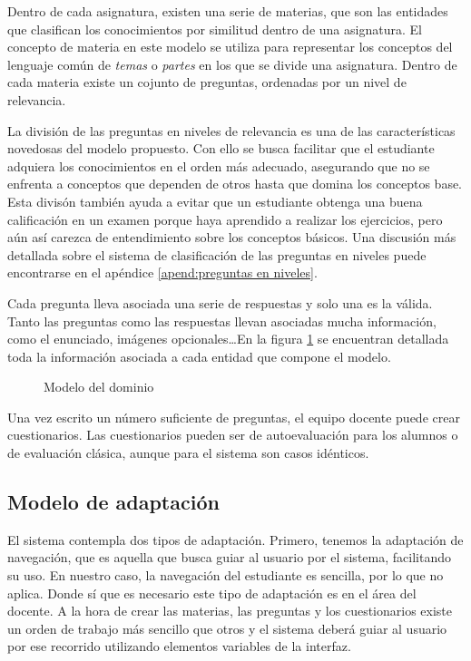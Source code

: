 Dentro de cada asignatura, existen una serie de materias, que son las entidades que clasifican los conocimientos por similitud dentro de una asignatura. El concepto de materia en este modelo se utiliza para representar los conceptos del lenguaje común de \emph{temas} o \emph{partes} en los que se divide una asignatura. Dentro de cada materia existe un cojunto de preguntas, ordenadas por un nivel de relevancia.

La división de las preguntas en niveles de relevancia es una de las características novedosas del modelo propuesto. Con ello se busca facilitar que el estudiante adquiera los conocimientos en el orden más adecuado, asegurando que no se enfrenta a conceptos que dependen de otros hasta que domina los conceptos base. Esta divisón también ayuda a evitar que un estudiante obtenga una buena calificación en un examen porque haya aprendido a realizar los ejercicios, pero aún así carezca de entendimiento sobre los conceptos básicos. Una discusión más detallada sobre el sistema de clasificación de las preguntas en niveles puede encontrarse en el apéndice \ref{apend:preguntas en niveles}.

Cada pregunta lleva asociada una serie de respuestas y solo una es la válida. Tanto las preguntas como las respuestas llevan asociadas mucha información, como el enunciado, imágenes opcionales\ldots En la figura \ref{fig:modelo del dominio} se encuentran detallada toda la información asociada a cada entidad que compone el modelo.

\begin{figure}[htp!]
	\centering
	\caption{Modelo del dominio}
	\label{fig:modelo del dominio}
\end{figure}

Una vez escrito un número suficiente de preguntas, el equipo docente puede crear cuestionarios. Las cuestionarios pueden ser de autoevaluación para los alumnos o de evaluación clásica, aunque para el sistema son casos idénticos.


\subsection{Modelo de adaptación}

El sistema contempla dos tipos de adaptación. Primero, tenemos la adaptación de navegación, que es aquella que busca guiar al usuario por el sistema, facilitando su uso. En nuestro caso, la navegación del estudiante es sencilla, por lo que no aplica. Donde sí que es necesario este tipo de adaptación es en el área del docente. A la hora de crear las materias, las preguntas y los cuestionarios existe un orden de trabajo más sencillo que otros y el sistema deberá guiar al usuario por ese recorrido utilizando elementos variables de la interfaz.

